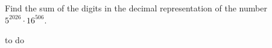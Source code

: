 Find the sum of the digits in the decimal representation of the number ${5^{2026}\cdot16^{506}}$. 

\begin{answer}
to do
\end{answer}
